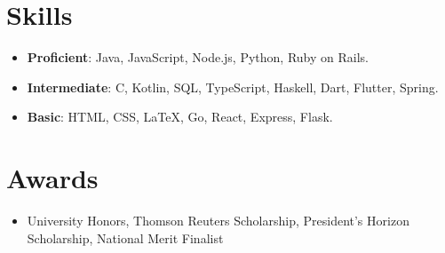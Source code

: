 \documentclass[letterpaper,11pt]{article}
\makeatletter
\newcommand{\resumeItem}[1]{
  \item\small{
    #1 \vspace{-2pt}
  }
}
\newcommand{\resumeSubheading}[4]{
  \vspace{-1pt}\item[]
    \begin{tabular*}\textwidth{l@{\extracolsep{\fill}}r}
      \textbf{#1} & #2 \\
      \small#3 & \small #4 \\
    \end{tabular*}\vspace{-5pt}
}
\newcommand{\resumeSubItem}[1]{\resumeItem{#1}\vspace{-4pt}}
\newcommand{\resumeSubHeadingListStart}{\begin{itemize}[leftmargin=*]}
\newcommand{\resumeSubHeadingListEnd}{\end{itemize}}
\newcommand{\resumeItemListStart}{\begin{itemize}}
\newcommand{\resumeItemListEnd}{\end{itemize}\vspace{-5pt}}
\makeatother
\begin{document}


\section{Skills}
  \resumeSubHeadingListStart
    \resumeSubItem
      {\textbf{Proficient}: Java, JavaScript, Node.js, Python, Ruby on Rails.}
    \resumeSubItem
      {\textbf{Intermediate}: C, Kotlin, SQL, TypeScript, Haskell, Dart, Flutter, Spring.}
    \resumeSubItem
      {\textbf{Basic}: HTML, CSS, \LaTeX, Go, React, Express, Flask.}
  \resumeSubHeadingListEnd

\section{Awards}
  \resumeSubHeadingListStart
    \resumeSubItem
      {University Honors, Thomson Reuters Scholarship, President's Horizon Scholarship, National Merit Finalist}
  \resumeSubHeadingListEnd
  

\end{document}
